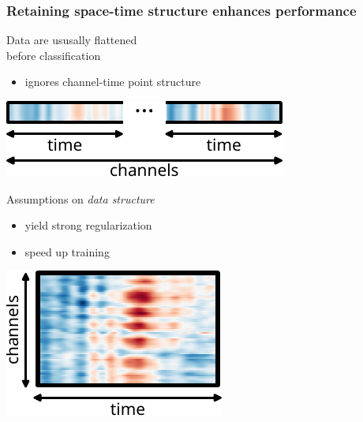 \documentclass{kul-ulille-beamer}
\begin{document}
\begin{frame}[c]
  \frametitle{Retaining space-time structure enhances performance}
  \bigskip

  \begin{minipage}[c]{.5\textwidth}
    Data are ususally flattened \\ before classification
    \begin{itemize}
      \item   ignores channel-time point structure
    \end{itemize}
  \end{minipage}\hfill%
  \begin{minipage}[c]{.4\textwidth}
    \vfill
    \raggedleft
    \includegraphics[width=.9\textwidth]{figures/bttda/tensor_flat.pdf}
  \end{minipage}
  \bigskip
  \bigskip

  \begin{minipage}[c]{.5\textwidth}
    Assumptions on \emph{data structure}
    \begin{itemize}
      \item yield strong regularization
      \item speed up training
    \end{itemize}
  \end{minipage}\hfill%
  \begin{minipage}[c]{.4\textwidth}
    \includegraphics[width=\textwidth]{figures/bttda/tensor_st.pdf}
  \end{minipage}

\end{frame}
\end{document}
